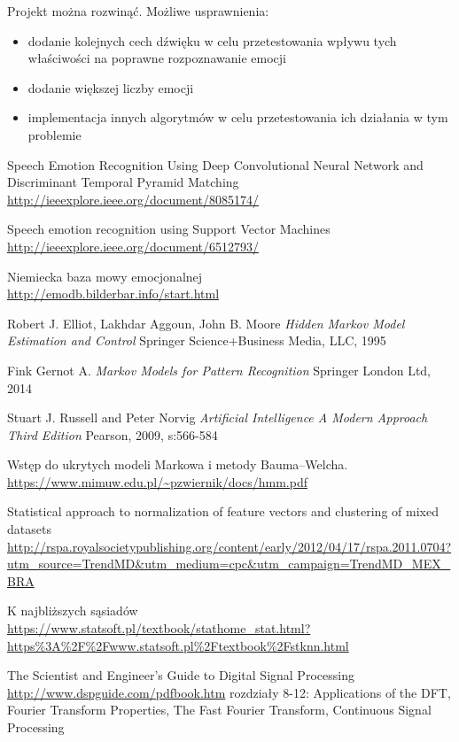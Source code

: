 \documentclass[declaration,shortabstract]{iithesis}
\begin{document}
Projekt można rozwinąć. Możliwe usprawnienia:
\begin{itemize}
\item dodanie kolejnych cech dźwięku w celu przetestowania wpływu tych właściwości na poprawne rozpoznawanie emocji
\item dodanie większej liczby emocji
\item implementacja innych algorytmów w celu przetestowania ich działania w tym problemie
\end{itemize}

\begin{thebibliography}{99}

Speech Emotion Recognition Using Deep Convolutional Neural Network and Discriminant Temporal Pyramid Matching
\\\url{http://ieeexplore.ieee.org/document/8085174/}

Speech emotion recognition using Support Vector Machines
\\\url{http://ieeexplore.ieee.org/document/6512793/}

Niemiecka baza mowy emocjonalnej
\\\url{http://emodb.bilderbar.info/start.html}

\bibitem{}
Robert J. Elliot, Lakhdar Aggoun, John B. Moore 
\textit{Hidden Markov Model Estimation and Control}
Springer Science+Business Media, LLC, 1995

\bibitem{}
Fink Gernot A.
\textit{Markov Models for Pattern Recognition}
Springer London Ltd, 2014

\bibitem{}
Stuart J. Russell and Peter Norvig
\textit{Artificial Intelligence A Modern Approach Third Edition}
Pearson, 2009, s:566-584

\bibitem{}
Wstęp do ukrytych modeli Markowa i metody Bauma–Welcha.
\\\url{https://www.mimuw.edu.pl/~pzwiernik/docs/hmm.pdf}

\bibitem{}
Statistical approach to normalization of feature vectors and clustering of mixed datasets
\\\url{http://rspa.royalsocietypublishing.org/content/early/2012/04/17/rspa.2011.0704?utm\_source=TrendMD\&utm\_medium=cpc\&utm\_campaign=TrendMD\_MEX\_BRA}

\bibitem{}
K najbliższych sąsiadów
\\\url{https://www.statsoft.pl/textbook/stathome\_stat.html?https\%3A\%2F\%2Fwww.statsoft.pl\%2Ftextbook\%2Fstknn.html}

\bibitem{}
The Scientist and Engineer's Guide to Digital Signal Processing
\\\url{http://www.dspguide.com/pdfbook.htm}
rozdziały 8-12: Applications of the DFT, Fourier Transform Properties, The Fast Fourier Transform, Continuous Signal Processing

\end{thebibliography}
\end{document}
